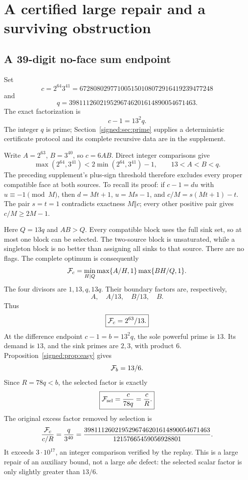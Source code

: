 \clearpage
\section{A certified large repair and a surviving obstruction}
\subsection{A 39-digit no-face sum endpoint}
Set
\[
 c=2^{64}3^{41}=672808029771005150108072916419239477248
\]
and
\[
 q=3981112602195296746201614890054671463.
\]
The exact factorization is
\begin{equation}\label{signed:eq:bigfactor}
 c-1=13^2q.
\end{equation}
The integer \(q\) is prime; Section~\ref{signed:sec:prime} supplies a deterministic certificate protocol and its complete recursive data are in the supplement.

Write \(A=2^{63}\), \(B=3^{40}\), so \(c=6AB\). Direct integer comparisons give
\[
 \max(2^{64},3^{41})<2\min(2^{64},3^{41})-1,
 \qquad 13<A<B<q.
\]
The preceding supplement's plus-sign threshold therefore excludes every proper compatible face at both sources. To recall its proof: if \(c-1=du\) with \(u\equiv-1\pmod M\), then \(d=Mt+1\), \(u=Ms-1\), and \(c/M=s(Mt+1)-t\). The pair \(s=t=1\) contradicts exactness \(M\Vert c\); every other positive pair gives \(c/M\ge2M-1\).

Here \(Q=13q\) and \(AB>Q\). Every compatible block uses the full sink set, so at most one block can be selected. The two-source block is unsaturated, while a singleton block is no better than assigning all sinks to that source. There are no flags. The complete optimum is consequently
\[
 \mathcal F_c=\min_{H\mid Q}\max\{A/H,1\}\max\{BH/Q,1\}.
\]
The four divisors are \(1,13,q,13q\). Their boundary factors are, respectively,
\[
 A,\quad A/13,\quad B/13,\quad B.
\]
Thus
\begin{equation}\label{signed:eq:bigplus}
 \boxed{\mathcal F_c=2^{63}/13.}
\end{equation}
At the difference endpoint \(c-1=b=13^2q\), the sole powerful prime is \(13\). Its demand is \(13\), and the sink primes are \(2,3\), with product \(6\). Proposition~\ref{signed:prop:easy} gives
\[
 \mathcal F_b=13/6.
\]
Since \(R=78q<b\), the selected factor is exactly
\begin{equation}\label{signed:eq:bigselect}
 \boxed{\mathcal F_{\mathrm{sel}}=\frac c{78q}=\frac cR.}
\end{equation}
The original excess factor removed by selection is
\begin{equation}\label{signed:eq:bigwaste}
 \frac{\mathcal F_c}{c/R}=\frac q{3^{40}}
 =\frac{3981112602195296746201614890054671463}{12157665459056928801}.
\end{equation}
It exceeds \(3\cdot10^{17}\), an integer comparison verified by the replay. This is a large repair of an auxiliary bound, not a large \(abc\) defect: the selected scalar factor is only slightly greater than \(13/6\).

